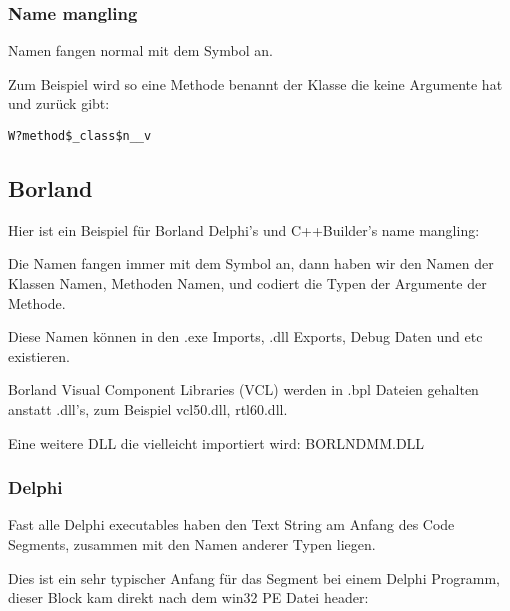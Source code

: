 \subsubsection{Name mangling}

Namen fangen normal mit dem  Symbol an. 

Zum Beispiel wird so eine Methode benannt  der Klasse  die keine Argumente hat und \Tvoid zur\"uck gibt: %

\begin{lstlisting}
W?method$_class$n__v
\end{lstlisting}

\subsection{Borland}

Hier ist ein Beispiel f\"ur Borland Delphi's und C++Builder's \gls{name mangling}:



Die Namen fangen immer mit dem  Symbol an, dann haben wir den Namen
der Klassen Namen, Methoden Namen, und codiert die Typen der Argumente der Methode.

Diese Namen k\"onnen in den .exe Imports, .dll Exports, Debug Daten und etc existieren.

Borland Visual Component Libraries (VCL) 
werden in .bpl Dateien gehalten anstatt .dll's, zum Beispiel vcl50.dll, rtl60.dll.

Eine weitere DLL die vielleicht importiert wird: BORLNDMM.DLL

\subsubsection{Delphi}

Fast alle Delphi executables haben den  Text String am Anfang des Code Segments, zusammen mit den Namen anderer Typen liegen.

Dies ist ein sehr typischer Anfang f\"ur das  Segment bei einem 
Delphi Programm, dieser Block kam direkt nach dem win32 PE Datei header:


